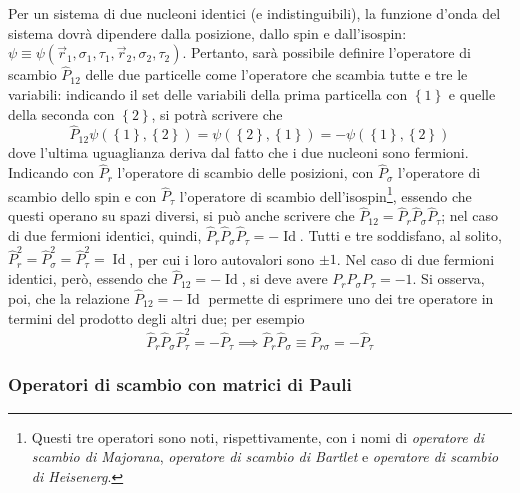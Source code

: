 \documentclass[11pt, a4paper]{scrartcl}
\theoremstyle{style}
\numberwithin{equation}{subsection}
\begin{document}
Per un sistema di due nucleoni identici (e indistinguibili), la funzione d'onda del sistema dovr\`a dipendere dalla posizione, dallo spin e dall'isospin: $\psi \equiv \psi (\vec{r}_1, \sigma _1,\tau _1, \vec{r}_2, \sigma _2,\tau _2)$.
Pertanto, sar\`a possibile definire l'operatore di scambio $\hat{P}_{12}$ delle due particelle come l'operatore che scambia tutte e tre le variabili: indicando il set delle variabili della prima particella con $\left\{ 1 \right\} $ e quelle della seconda con $\left\{ 2 \right\} $, si potr\`a scrivere che
\[
	\hat{P}_{12} \psi (\left\{ 1 \right\} , \left\{ 2 \right\} ) = \psi (\left\{ 2 \right\} ,\left\{ 1 \right\} ) = - \psi (\left\{ 1 \right\} , \left\{ 2 \right\} )
\] 
dove l'ultima uguaglianza deriva dal fatto che i due nucleoni sono fermioni.
Indicando con $\hat{P}_r$ l'operatore di scambio delle posizioni, con $\hat{P}_\sigma $ l'operatore di scambio dello spin e con $\hat{P}_\tau $	l'operatore di scambio dell'isospin\footnote{Questi tre operatori sono noti, rispettivamente, con i nomi di \textit{operatore di scambio di Majorana}, \textit{operatore di scambio di Bartlet} e \textit{operatore di scambio di Heisenerg}.}, essendo che questi operano su spazi diversi, si pu\`o anche scrivere che $\hat{P}_{12} = \hat{P}_r \hat{P}_\sigma  \hat{P}_\tau$; nel caso di due fermioni identici, quindi, $\hat{P}_r \hat{P}_\sigma  \hat{P}_\tau = - \operatorname{Id} $.
Tutti e tre soddisfano, al solito, $\hat{P}_r^2 = \hat{P}_\sigma ^2 = \hat{P}_\tau ^2 = \operatorname{Id} $, per cui i loro autovalori sono $\pm 1$.
Nel caso di due fermioni identici, per\`o, essendo che $\hat{P}_{12} = - \operatorname{Id} $, si deve avere $P_rP_\sigma P_\tau = -1$.
Si osserva, poi, che la relazione $\hat{P}_{12} = -\operatorname{Id} $ permette di esprimere uno dei tre operatore in termini del prodotto degli altri due; per esempio
\[
\hat{P}_r \hat{P}_\sigma \hat{P}_\tau ^2 = - \hat{P}_\tau  \implies \hat{P}_r \hat{P}_\sigma\equiv \hat{P}_{r\sigma }  = - \hat{P}_\tau 
\] 

\subsubsection{Operatori di scambio con matrici di Pauli}
\end{document}
